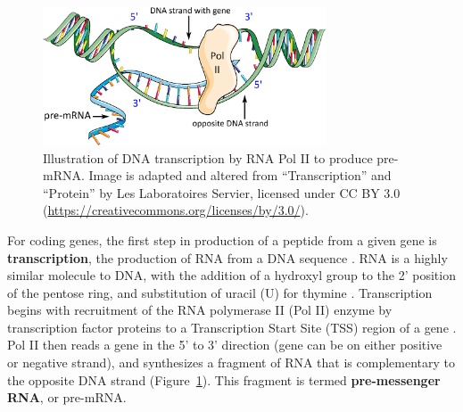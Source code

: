 \begin{figure}[htb]
    \centering
    \includegraphics[width=0.75\textwidth,keepaspectratio]{images/intro/transcription}
    \caption[Illustration of DNA transcription.]{Illustration of DNA transcription by RNA Pol II to produce pre-mRNA\@. Image is adapted and altered from ``Transcription'' and ``Protein'' by Les Laboratoires Servier, licensed under CC BY 3.0 (\url{https://creativecommons.org/licenses/by/3.0/}).}
    \label{fig:intro:transcription}
\end{figure}
For coding genes, the first step in production of a peptide from a given gene is \textbf{transcription}, the production of RNA from a DNA sequence \cite{sainsbury2015}. RNA is a highly similar molecule to DNA, with the addition of a hydroxyl group to the 2' position of the pentose ring, and substitution of uracil (U) for thymine \cite{horton19_2006}. Transcription begins with recruitment of the RNA polymerase II (Pol II) enzyme by transcription factor proteins to a Transcription Start Site (TSS) region of a gene \cite{kapranov2009}. Pol II then reads a gene in the 5' to 3' direction (gene can be on either positive or negative strand), and synthesizes a fragment of RNA that is complementary to the opposite DNA strand (Figure~\ref{fig:intro:transcription}). This fragment is termed \textbf{pre-messenger RNA}, or pre-mRNA.

